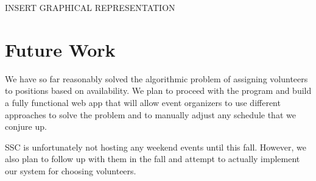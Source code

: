\documentclass[11pt]{article}
\theoremstyle{definition}
\begin{document}
\begin{multicols}{2}
INSERT GRAPHICAL REPRESENTATION

\section{Future Work}
We have so far reasonably solved the algorithmic problem of assigning volunteers to positions based on availability.
We plan to proceed with the program and build a fully functional web app that will allow event organizers to use different approaches to solve the problem and to manually adjust any schedule that we conjure up.

SSC is unfortunately not hosting any weekend events until this fall.
However, we also plan to follow up with them in the fall and attempt to actually implement our system for choosing volunteers.

\end{multicols}
\end{document}
